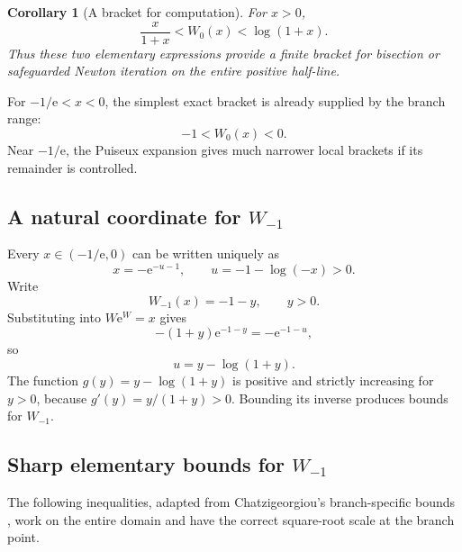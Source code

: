 \documentclass[11pt]{article}
\numberwithin{equation}{section}
\newtheorem{corollary}[theorem]{Corollary}
\theoremstyle{definition}
\theoremstyle{remark}
\newcommand{\e}{\mathrm e}
\begin{document}
\begin{corollary}[A bracket for computation]
\label{cor:w0-positive-bracket}
For $x>0$,
\begin{equation}
 \frac{x}{1+x}<W_0(x)<\log(1+x).                       \label{eq:w0-positive-bracket}
\end{equation}
Thus these two elementary expressions provide a finite bracket for bisection
or safeguarded Newton iteration on the entire positive half-line.
\end{corollary}

For $-1/\e<x<0$, the simplest exact bracket is already supplied by the branch
range:
\begin{equation}
  -1<W_0(x)<0.                                         \label{eq:w0-negative-bracket}
\end{equation}
Near $-1/\e$, the Puiseux expansion gives much narrower local brackets if its
remainder is controlled.

\subsection{A natural coordinate for \texorpdfstring{$W_{-1}$}{W-1}}

Every $x\in(-1/\e,0)$ can be written uniquely as
\begin{equation}
  x=-\e^{-u-1},\qquad u=-1-\log(-x)>0.                 \label{eq:u-for-wm1}
\end{equation}
Write
\begin{equation}
  W_{-1}(x)=-1-y,
  \qquad y>0.                                          \label{eq:y-for-wm1}
\end{equation}
Substituting into $W\e^W=x$ gives
\[
 -(1+y)\e^{-1-y}=-\e^{-1-u},
\]
so
\begin{equation}
  u=y-\log(1+y).                                       \label{eq:u-g-y}
\end{equation}
The function $g(y)=y-\log(1+y)$ is positive and strictly increasing for
$y>0$, because $g'(y)=y/(1+y)>0$.  Bounding its inverse produces bounds for
$W_{-1}$.

\subsection{Sharp elementary bounds for \texorpdfstring{$W_{-1}$}{W-1}}

The following inequalities, adapted from Chatzigeorgiou's branch-specific
bounds \cite{Chatzigeorgiou2013}, work on the entire domain and have the correct
square-root scale at the branch point.
\end{document}
